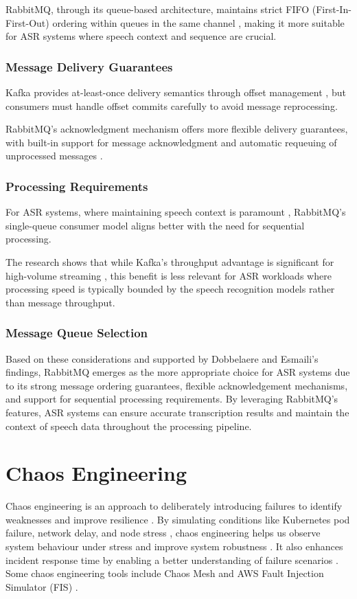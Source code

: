 RabbitMQ, through its queue-based architecture, maintains strict FIFO (First-In-First-Out) ordering within queues in the same channel \cite{kafka_v_rabbitmq}, making it more suitable for ASR systems where speech context and sequence are crucial.

\subsubsection{Message Delivery Guarantees}
Kafka provides at-least-once delivery semantics through offset management \cite{kafka_v_rabbitmq}, but consumers must handle offset commits carefully to avoid message reprocessing.

RabbitMQ's acknowledgment mechanism offers more flexible delivery guarantees, with built-in support for message acknowledgment \cite{kafka_v_rabbitmq} and automatic requeuing of unprocessed messages \cite{rabbitmq_nack}.

\subsubsection{Processing Requirements}
For ASR systems, where maintaining speech context is paramount \cite{speech_context}, RabbitMQ's single-queue consumer model aligns better with the need for sequential processing.

The research shows that while Kafka's throughput advantage is significant for high-volume streaming \cite{kafka_v_rabbitmq}, this benefit is less relevant for ASR workloads where processing speed is typically bounded by the speech recognition models rather than message throughput.

\subsubsection{Message Queue Selection}
Based on these considerations and supported by Dobbelaere and Esmaili's \cite{kafka_v_rabbitmq} findings, RabbitMQ emerges as the more appropriate choice for ASR systems due to its strong message ordering guarantees, flexible acknowledgement mechanisms, and support for sequential processing requirements. By leveraging RabbitMQ's features, ASR systems can ensure accurate transcription results and maintain the context of speech data throughout the processing pipeline.

\section{Chaos Engineering}
Chaos engineering is an approach to deliberately introducing failures to identify weaknesses and improve resilience \cite{chaos_engineering_definition}. By simulating conditions like Kubernetes pod failure, network delay, and node stress \cite{chaos_mesh_feature}, chaos engineering helps us observe system behaviour under stress and improve system robustness \cite{chaos_engineering_definition}. It also enhances incident response time by enabling a better understanding of failure scenarios \cite{chaos_engineering_definition}. Some chaos engineering tools include Chaos Mesh \cite{chaos_mesh_introduction} and AWS Fault Injection Simulator (FIS) \cite{fis_introduction}.

